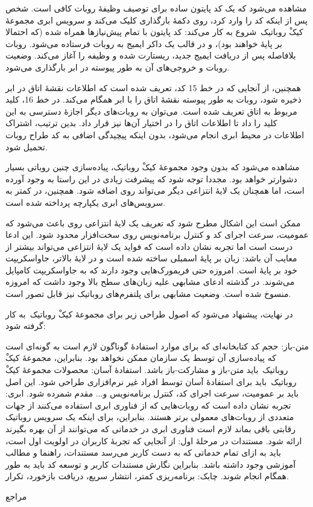 \documentclass{cake-classes/short-report-fa}
\newcommand{\کیک}{مجموعهٔ کیکْ روباتیک}
\begin{document}

مشاهده می‌شود که یک کد پایتون ساده برای توصیف وظیفهٔ روبات کافی است.
شخص پس از اینکه کد را وارد کرد، روی دکمهٔ بارگذاری کلیک می‌کند و سرویس ابری \کیک\ شروع به کار می‌کند:
کد پایتون با تمام پیش‌نیازها همراه شده (که احتمالا بر پایهٔ  خواهند بود)، و در قالب یک داکر ایمیج به روبات فرستاده می‌شود.
روبات بلافاصله پس از دریافت ایمیج جدید، ریستارت شده و وظیفه را آغاز می‌کند.
وضعیت روبات و خروجی‌های آن به طور پیوسته در ابر بارگذاری می‌شود.

همچنین، از آنجایی که در خط 15 کد، تعریف شده است که اطلاعات نقشهٔ اتاق در ابر ذخیره شود، روبات به طور پیوسته نقشهٔ اتاق را با ابر همگام می‌کند.
در خط 16، کلید مربوط به اتاق تعریف شده است.
می‌توان به روبات‌های دیگر اجازهٔ دسترسی به این کلید را داد تا اطلاعات اتاق را در اختیار آن‌ها نیز قرار داد.
بدین ترتیب، اشتراک اطلاعات در محیط ابری انجام می‌شود، بدون اینکه پیچیدگی اضافی به کد طراح روبات تحمیل شود.

مشاهده می‌شود که بدون وجود \کیک، پیاده‌سازی چنین روباتی بسیار دشوارتر خواهد بود.
مجددا توجه شود که  پیشرفت زیادی در این راستا به وجود آورده است، اما همچنان یک لایهٔ انتزاعی دیگر می‌تواند روی  اضافه شود.
همچنین، در  کمتر به سرویس‌های ابری یکپارچه پرداخته شده است.

ممکن است این اشکال مطرح شود که تعریف یک لایهٔ انتزاعی روی  باعث می‌شود که عمومیت، سرعت اجرای کد و کنترل برنامه‌نویس روی سخت‌افزار محدود شود.
این ادعا درست است اما تجربه نشان داده است که فواید یک لایهٔ انتزاعی می‌تواند بیشتر از معایب آن باشد:
زبان  بر پایهٔ اسمبلی ساخته شده است و در لایهٔ بالاتر، جاواسکریپت خود بر پایهٔ  است. امروزه حتی فریمورک‌هایی وجود دارند که به جاواسکریپت کامپایل می‌شوند. در گذشته ادعای مشابهی علیه زبان‌های سطح بالا وجود داشت که امروزه منسوخ شده است. وضعیت مشابهی برای پلتفرم‌های روباتیک نیز قابل تصور است.


در نهایت، پیشنهاد می‌شود که اصول طراحی زیر برای \کیک\ به کار گرفته شود:

 متن-باز: حجم کد کتابخانه‌ای که برای موارد استفادهٔ گوناگون لازم است به گونه‌ای است که پیاده‌سازی آن توسط یک سازمان ممکن نخواهد بود. بنابراین، \کیک\ باید متن-باز و مشارکت-باز باشد.
 استفادهٔ آسان: محصولات \کیک\ باید برای استفادهٔ آسان توسط افراد غیر نرم‌افزاری طراحی شود. این اصل باید بر عمومیت، سرعت اجرای کد، کنترل برنامه‌نویس و... مقدم شمرده شود.
 ابری: تجربه نشان داده است که روبات‌هایی که از فناوری ابری استفاده می‌کنند از جهات متعددی از روبات‌های معمولی برتر هستند. بنابراین، برای اینکه یک سرویس روباتیک رقابتی باقی بماند لازم است فناوری ابری در خدماتی که می‌توانند از آن بهره بگیرند ارائه شود.
 مستندات در مرحلهٔ اول: از آنجایی که تجربهٔ کاربران در اولویت اول است، باید به ازای تمام خدماتی که به دست کاربر می‌رسد مستندات، راهنما و مطالب آموزشی وجود داشته باشد. بنابراین نگارش مستندات کاربر و توسعه کد باید به طور همگام انجام شوند.
 چابک: برنامه‌ریزی کمتر، انتشار سریع، دریافت بازخورد، تکرار.


‌مراجع{}
\end{document}
